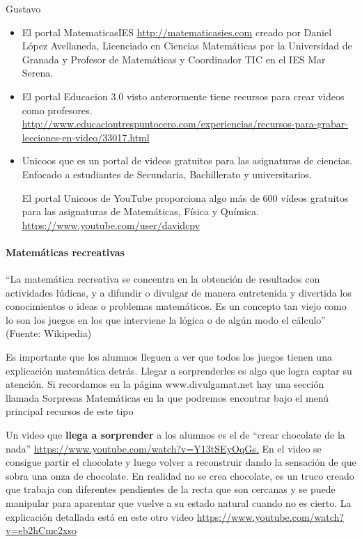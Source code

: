 \begin{opin}{\guscolor}{Gustavo}
\begin{leftbar}{\guscolor}
\begin{itemize}
\item El portal MatematicasIES \url{http://matematicasies.com} creado por Daniel López Avellaneda, Licenciado en Ciencias Matemáticas por la Universidad de Granada y Profesor de Matemáticas y Coordinador TIC en el IES Mar Serena. 

\item El portal Educacion 3.0 visto anterormente tiene recursos para crear videos como profesores. \url{http://www.educaciontrespuntocero.com/experiencias/recursos-para-grabar-lecciones-en-video/33017.html}  

\item Unicoos que es un portal de videos gratuitos para las asignaturas de ciencias. Enfocado a estudiantes de Secundaria, Bachillerato y universitarios.  

El portal Unicoos de YouTube proporciona algo más de 600 vídeos gratuitos para las asignaturas de Matemáticas, Física y Química. \url{https://www.youtube.com/user/davidcpv}
\end{itemize}

\paragraph{Matemáticas recreativas}
“La matemática recreativa se concentra en la obtención de resultados con actividades lúdicas, y a difundir o divulgar de manera entretenida y divertida los conocimientos o ideas o problemas matemáticos. Es un concepto tan viejo como lo son los juegos en los que interviene la lógica o de algún modo el cálculo” (Fuente: Wikipedia)

Es importante que los alumnos lleguen a ver que todos los juegos tienen una explicación matemática detrás. Llegar a sorprenderles es algo que logra captar su atención. Si recordamos en la página www.divulgamat.net hay una sección llamada Sorpresas Matemáticas en la que podremos encontrar bajo el menú principal recursos de este tipo


 
Un video que \textbf{llega a sorprender} a los alumnos es el de “crear chocolate de la nada” \url{https://www.youtube.com/watch?v=Y13tSEyOqGs.} En el video se consigue partir el chocolate y luego volver a reconstruir dando la sensación de que sobra una onza de chocolate. En realidad no se crea chocolate, es un truco creado que trabaja con diferentes pendientes de la recta que son cercanas y se puede manipular para aparentar que vuelve a su estado natural cuando no es cierto. La explicación detallada está en este otro video \url{https://www.youtube.com/watch?v=eb2hCmc2xso}


\end{leftbar}
\end{opin}
